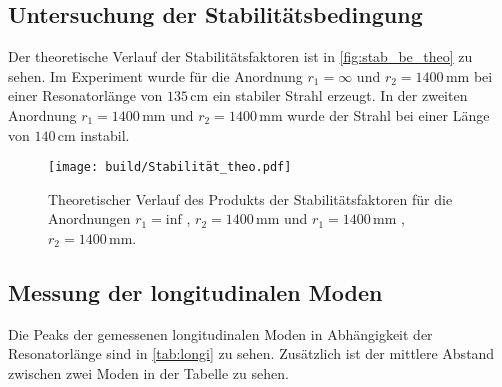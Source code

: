 \subsection{Untersuchung der Stabilitätsbedingung}
\label{sec:Stab_be}
Der theoretische Verlauf der Stabilitätsfaktoren ist in \autoref{fig:stab_be_theo} zu sehen.
Im Experiment wurde für die Anordnung $r_1 = \infty$ und $r_2 = 1400 \, \unit{\milli\meter}$ bei einer Resonatorlänge von $135 \, \unit{\centi\meter}$ ein stabiler Strahl erzeugt.
In der zweiten Anordnung $r_1 = 1400 \, \unit{\milli\meter}$ und $r_2 = 1400 \, \unit{\milli\meter}$ wurde der Strahl bei einer Länge von $140 \, \unit{\centi\meter}$ instabil.
 \begin{figure}[H]
    \centering
    \texttt{[image: build/Stabilität\_theo.pdf]}
    \caption{Theoretischer Verlauf des Produkts der Stabilitätsfaktoren für die Anordnungen $r_1 = \text{inf}$ , $r_2 = 1400 \, \unit{\milli\meter}$ und $r_1 = 1400 \, \unit{\milli\meter}$ , $r_2 = 1400 \, \unit{\milli\meter}$.}
    \label{fig:stab_be_theo}
\end{figure}

\subsection{Messung der longitudinalen Moden}
\label{sec:Stab_be}
Die Peaks der gemessenen longitudinalen Moden in Abhängigkeit der Resonatorlänge sind in \autoref{tab:longi} zu sehen.
Zusätzlich ist der mittlere Abstand zwischen zwei Moden in der Tabelle zu sehen.

